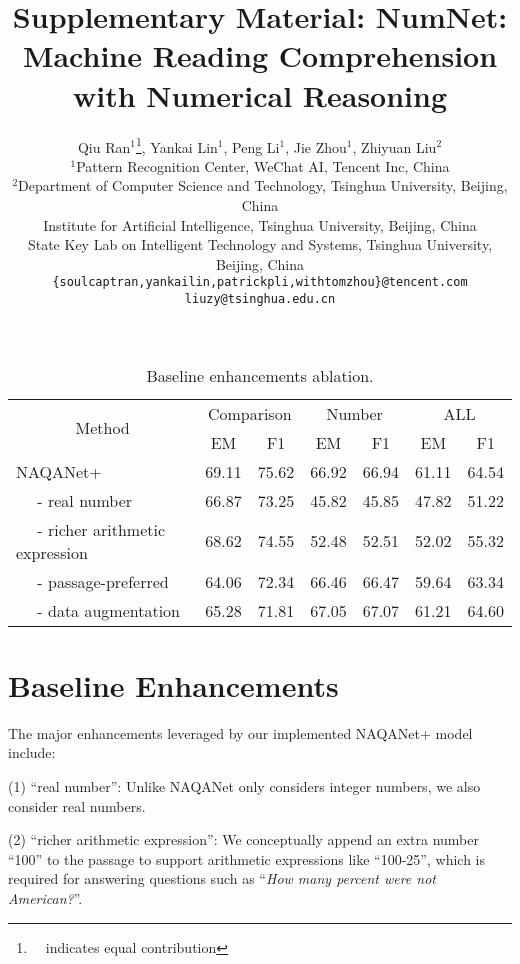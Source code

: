\documentclass[11pt,a4paper]{article}
\title{Supplementary Material: NumNet: Machine Reading Comprehension with Numerical Reasoning}
\author{Qiu Ran$^1$\thanks{\ \ indicates equal contribution}, Yankai Lin$^1$\footnotemark[1], Peng Li$^1$, Jie Zhou$^1$, Zhiyuan Liu$^2$ \\
  $^1$Pattern Recognition Center, WeChat AI, Tencent Inc, China \\
  $^{2}$Department of Computer Science and Technology, Tsinghua University, Beijing, China\\
Institute for Artificial Intelligence, Tsinghua University, Beijing, China\\
State Key Lab on Intelligent Technology and Systems, Tsinghua University, Beijing, China \\
  \texttt{\{soulcaptran,yankailin,patrickpli,withtomzhou\}@tencent.com}\\
  \texttt{liuzy@tsinghua.edu.cn}
}
\date{}
\begin{document}
\maketitle

\appendix
\begin{table*}[h!]
  \centering
  \small
  
  \begin{tabular}{lcccccc}
    \toprule
    \multicolumn{1}{c}{\multirow{2}{*}{Method}}  & \multicolumn{2}{c}{Comparison}        &\multicolumn{2}{c}{Number} & \multicolumn{2}{c}{ALL} \\
    \cmidrule(r){2-3}  \cmidrule(r){4-5} \cmidrule(r){6-7}
                                           & EM    & F1    & EM    & F1    & EM    & F1\\
    \midrule
    NAQANet+                               & 69.11 & 75.62 & 66.92 & 66.94 & 61.11 & 64.54\\
    $\quad$ - real number                  & 66.87 & 73.25 & 45.82 & 45.85 & 47.82 & 51.22\\
    $\quad$ - richer arithmetic expression & 68.62 & 74.55 & 52.48 & 52.51 & 52.02 & 55.32\\
    
    $\quad$ - passage-preferred            & 64.06 & 72.34 & 66.46 & 66.47 & 59.64 & 63.34\\
    $\quad$ - data augmentation            & 65.28 & 71.81 & 67.05 & 67.07 & 61.21 & 64.60\\
    \bottomrule
  \end{tabular}
  \caption{Baseline enhancements ablation.}
  \label{tab:tricks}
\end{table*}

\section{Baseline Enhancements}
\label{sec:tricks}

The major enhancements leveraged by our implemented NAQANet+ model
include:

(1) ``real number'': Unlike NAQANet only considers integer numbers, we also consider real numbers.

(2) ``richer arithmetic expression'': We conceptually append an extra number ``100'' to the passage to support arithmetic expressions like ``100-25'', which is required for answering questions such as ``\emph{How many percent were not American?}''.
\end{document}
